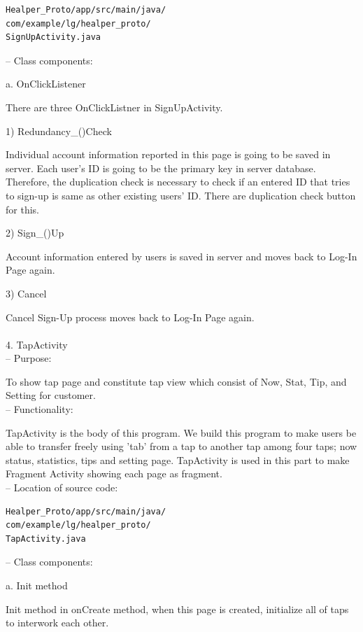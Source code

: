 \documentclass[conference]{IEEEtran}
\begin{document}
\begin{verbatim} 
Healper_Proto/app/src/main/java/
com/example/lg/healper_proto/
SignUpActivity.java
 \end{verbatim}
 
 --	Class components:

a. OnClickListener

There are three OnClickListner in SignUpActivity.

  1) Redundancy\_()Check

  Individual account information reported in this page is going to be saved in server. Each user's ID is going to be the primary key in server database. Therefore, the duplication check is necessary to check if an entered ID that tries to sign-up is same as other existing users' ID. There are duplication check button for this. 

  2) Sign\_()Up

  Account information entered by users is saved in server and moves back to Log-In Page again.

  3) Cancel

  Cancel Sign-Up process moves back to Log-In Page again.\\\\



4.	TapActivity\\
 
 --	Purpose:
 
To show tap page and constitute tap view which consist of Now, Stat, Tip, and Setting for customer.\\
 
 --	Functionality:

TapActivity is the body of this program. We build this program to make users be able to transfer freely using 'tab' from a tap to another tap among four taps; now status, statistics, tips and setting page. TapActivity is used in this part to make Fragment Activity showing each page as fragment.\\

 --	Location of source code:
 
\begin{verbatim}
Healper_Proto/app/src/main/java/
com/example/lg/healper_proto/
TapActivity.java
 \end{verbatim}
 
 --	Class components:

a. Init method

Init method in onCreate method, when this page is created, initialize all of taps to interwork each other. 
\end{document}

